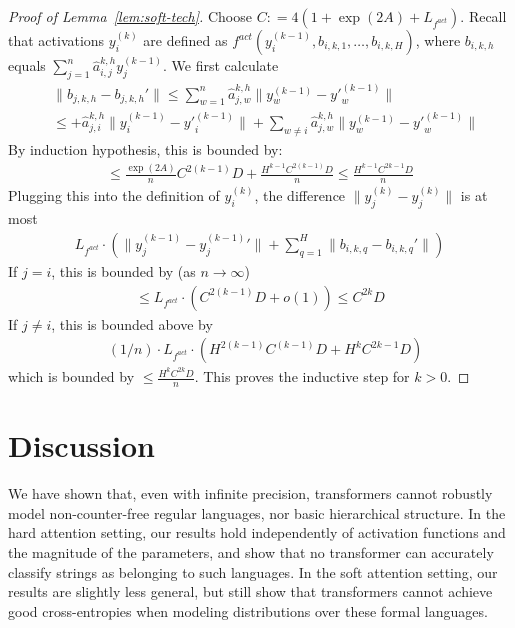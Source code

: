 \documentclass[11pt,a4paper]{article}
\begin{document}
\begin{proof}[Proof of Lemma~\ref{lem:soft-tech}]
Choose $C : = 4(1 + \exp(2A) + L_{f^{act}})$. 
Recall that activations $y_i^{(k)}$ are defined as $f^{act}(y_i^{(k-1)}, b_{i,k,1}, \dots, b_{i,k,H})$, where $b_{i,k,h}$ equals $\sum_{j=1}^n \hat{a}_{i,j}^{k,h} y_j^{(k-1)}$.
We first calculate
\begin{align*}
& \|b_{j,k,h} - b_{j,k,h}'\|  \leq \sum_{w=1}^n \hat{a}_{j,w}^{k,h} \|y_w^{(k-1)} - {y'}_w^{(k-1)}\|
\\
& \leq + \hat{a}_{j,i}^{k,h} \|y_i^{(k-1)} - {y'}_i^{(k-1)}\|  + \sum_{w \neq i} \hat{a}_{j,w}^{k,h} \|y_w^{(k-1)} - {y'}_w^{(k-1)}\| 
\end{align*}
By induction hypothesis, this is bounded by:
\begin{align*}
\leq \frac{\exp(2A)}{n}  C^{2(k-1)} D + \frac{H^{k-1}C^{2(k-1)}D}{n} \leq \frac{H^{k-1} C^{2k-1} D}{n}
\end{align*}
Plugging this into the definition of $y_i^{(k)}$, the difference $\|y_j^{(k)} - {y_j^{(k)}}\|$ is at most
\begin{align*}
	L_{f^{act}} \cdot \left(\|y_j^{(k-1)}-{y_j^{(k-1)}}'\| + \sum_{q=1}^H \|b_{i,k,q} - b_{i,k,q}'\|\right)
\end{align*}
If $j= i$, this is bounded by (as $n \rightarrow \infty$)
\begin{align*}
\leq L_{f^{act}} \cdot \left(C^{2(k-1)}D + o(1)\right) \leq C^{2k}D
\end{align*}
If $j\neq i$, this is bounded above by
\begin{align*}
	&  (1/n) \cdot L_{f^{act}} \cdot \left(H^{2(k-1)} C^{(k-1)}D + H^{k} C^{2k-1} D\right)
\end{align*} 
which is bounded by $\leq  \frac{H^{k} C^{2k} D}{n}$.
This proves the inductive step for $k>0$.
\end{proof}




\section{Discussion}\label{sec:discussion}

We have shown that, even with infinite precision, transformers cannot robustly model non-counter-free regular languages, nor basic hierarchical structure.
In the hard attention setting, our results hold independently of activation functions and the magnitude of the parameters, and show that no transformer   can accurately classify strings as belonging to such languages.
In the soft attention setting, our results are slightly less general, but still show that transformers cannot achieve good cross-entropies when modeling distributions over these formal languages.
\end{document}
